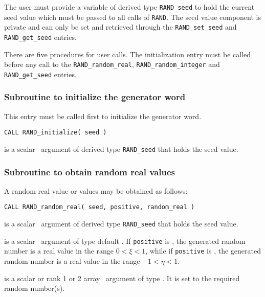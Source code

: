 \documentclass{galahad}
\newcommand{\packagename}{RAND}
\begin{document}

\galtypes
The user must provide a variable of derived type
{\tt \packagename\_seed}
to hold the current seed value which must be passed to all calls of
{\tt \packagename}.
The seed value component is private and can only be set and retrieved
through the
{\tt \packagename\_set\_seed}  and {\tt \packagename\_get\_seed} entries.


\galarguments
There are five procedures for user calls.
The initialization entry must be called before any call to the
{\tt \packagename\_random\_real},
{\tt \packagename\_random\_integer} and
{\tt \packagename\_get\_seed}  entries.


\subsubsection{Subroutine to initialize the generator word}\label{subinit}
This entry must be called first to initialize the generator word.
\vspace*{1mm}

\hskip 0.5in
{\tt CALL \packagename\_initialize( seed )}

\vspace*{-2mm}
\begin{description}
 is a scalar \intentout\ argument of derived type
{\tt \packagename\_seed}
that holds the seed value.
\end{description}


\subsubsection{Subroutine to obtain random real values}
A random real value or values may be obtained as follows:
\vspace*{1mm}

\hskip 0.5in
{\tt CALL \packagename\_random\_real( seed, positive, random\_real )}

\vspace*{-2mm}
\begin{description}
 is a scalar \intentinout\ argument of derived type
{\tt \packagename\_seed} that holds the seed value.

 is a scalar \intentin\ argument of type default
\logical. If {\tt positive} is \true,
the generated random number is a real value in the range $0 < \xi < 1$,
while if {\tt positive} is \false, the generated random number
is a real value in the range  $-1 < \eta < 1$.

 is a scalar or rank 1 or 2 array
\intentout\ argument of type \realdp.
It is set to the required random number(s).

\end{description}
\end{document}
